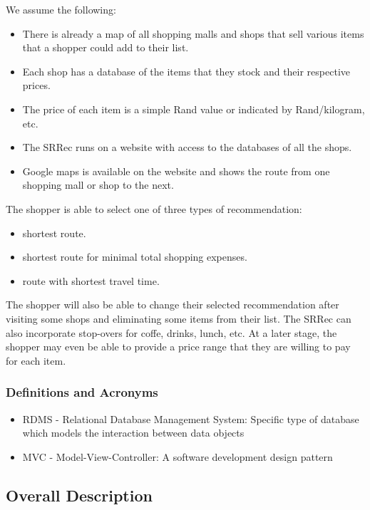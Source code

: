 \documentclass[10pt,twocolumn]{witseiepaper}
\begin{document}
			We assume the following:
			\begin{itemize}
				\item There is already a map of all shopping malls and shops that sell various items that a shopper could add to their list.
				\item Each shop has a database of the items that they stock and their respective prices.
				\item The price of each item is a simple Rand value or indicated by Rand/kilogram, etc.
				\item The SRRec runs on a website with access to the databases of all the shops.
				\item Google maps is available on the website and shows the route from one shopping mall or shop to the next.
			\end{itemize}
			
			The shopper is able to select one of three types of recommendation:
			\begin{itemize}
				\item shortest route.
				\item shortest route for minimal total shopping expenses.
				\item route with shortest travel time.
			\end{itemize}
			
			The shopper will also be able to change their selected recommendation after visiting some shops and eliminating some items from their list. The SRRec can also incorporate stop-overs for coffe, drinks, lunch, etc. At a later stage, the shopper may even be able to provide a price range that they are willing to pay for each item.
			
		\subsubsection{Definitions and Acronyms}
		
			\begin{itemize}
				\item RDMS - Relational Database Management System: Specific type of database which models the interaction between data objects
				\item MVC - Model-View-Controller: A software development design pattern
			\end{itemize}
		
	\subsection{Overall Description}
		
\end{document}
